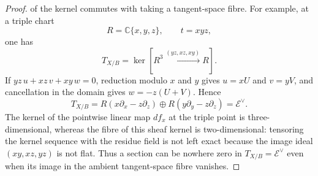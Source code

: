 \begin{proof}
of the kernel commutes with taking a tangent-space fibre.  For example, at a
triple chart
\[
 R=\mathbb C\{x,y,z\},\qquad t=xyz,
\]
one has
\[
 T_{X/B}=\ker\!\left[R^3\xrightarrow{(yz,xz,xy)}R\right].
\]
If $yz\,u+xz\,v+xy\,w=0$, reduction modulo $x$ and $y$ gives
$u=xU$ and $v=yV$, and cancellation in the domain gives
$w=-z(U+V)$.  Hence
\[
 T_{X/B}
 =R(x\partial_x-z\partial_z)\oplus
  R(y\partial_y-z\partial_z)
 =\mathcal E^\vee.
\]
The kernel of the pointwise linear map $df_x$ at the triple point is
three-dimensional, whereas the fibre of this sheaf kernel is
two-dimensional: tensoring the kernel sequence with the residue field is
not left exact because the image ideal $(xy,xz,yz)$ is not flat.  Thus a
section can be nowhere zero in $T_{X/B}=\mathcal E^\vee$ even when its image
in the ambient tangent-space fibre vanishes.


\end{proof}

